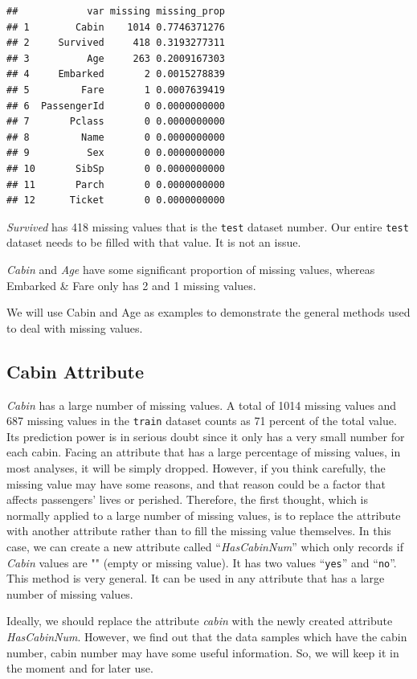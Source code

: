 \documentclass[
]{book}
\begin{document}
\begin{verbatim}
##            var missing missing_prop
## 1        Cabin    1014 0.7746371276
## 2     Survived     418 0.3193277311
## 3          Age     263 0.2009167303
## 4     Embarked       2 0.0015278839
## 5         Fare       1 0.0007639419
## 6  PassengerId       0 0.0000000000
## 7       Pclass       0 0.0000000000
## 8         Name       0 0.0000000000
## 9          Sex       0 0.0000000000
## 10       SibSp       0 0.0000000000
## 11       Parch       0 0.0000000000
## 12      Ticket       0 0.0000000000
\end{verbatim}

\emph{Survived} has 418 missing values that is the \texttt{test} dataset number. Our entire \texttt{test} dataset needs to be filled with that value. It is not an issue.

\emph{Cabin} and \emph{Age} have some significant proportion of missing values, whereas Embarked \& Fare only has 2 and 1 missing values.

We will use Cabin and Age as examples to demonstrate the general methods used to deal with missing values.

\hypertarget{cabin-attribute}{%
\subsection*{Cabin Attribute}\label{cabin-attribute}}


\emph{Cabin} has a large number of missing values. A total of 1014 missing values and 687 missing values in the \texttt{train} dataset counts as 71 percent of the total value. Its prediction power is in serious doubt since it only has a very small number for each cabin. Facing an attribute that has a large percentage of missing values, in most analyses, it will be simply dropped. However, if you think carefully, the missing value may have some reasons, and that reason could be a factor that affects passengers' lives or perished. Therefore, the first thought, which is normally applied to a large number of missing values, is to replace the attribute with another attribute rather than to fill the missing value themselves. In this case, we can create a new attribute called ``\emph{HasCabinNum}'' which only records if \emph{Cabin} values are "" (empty or missing value). It has two values ``\texttt{yes}'' and ``\texttt{no}''. This method is very general. It can be used in any attribute that has a large number of missing values.

Ideally, we should replace the attribute \emph{cabin} with the newly created attribute \emph{HasCabinNum}. However, we find out that the data samples which have the cabin number, cabin number may have some useful information. So, we will keep it in the moment and for later use.
\end{document}
